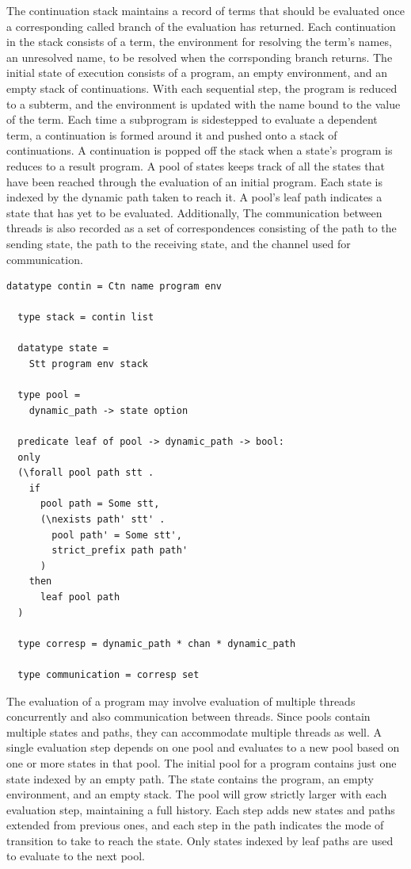 \documentclass[10pt]{article}
\begin{document}
The continuation stack maintains a record of terms that should be evaluated
once a corresponding called branch of the evaluation has returned.
Each continuation in the stack consists of a term, the environment for resolving the
term's names, an unresolved name, to be resolved when the corrsponding branch returns. 
The initial state of execution consists of a program, an empty environment, and an empty stack
of continuations. With each sequential step, the program is reduced to a subterm,
and the environment is updated with the name bound to the value of the term. Each time a
subprogram is sidestepped to evaluate a dependent term, a continuation is formed around
it and pushed onto a stack of continuations. A continuation is popped off the stack when a
state's program is reduces to a result program.  A pool of states keeps track of all the states
that have been reached through the evaluation of an initial program.  Each state is indexed by
the dynamic path taken to reach it. A pool's leaf path indicates a state that has yet to be
evaluated. Additionally, The communication between threads is also recorded as a set of
correspondences consisting of the path to the sending state, the path to the receiving state,
and the channel used for communication.

\begin{lstlisting}[language=logic, mathescape]
  datatype contin = Ctn name program env

  type stack = contin list

  datatype state =
    Stt program env stack 

  type pool =
    dynamic_path -> state option

  predicate leaf of pool -> dynamic_path -> bool:
  only
  (\forall pool path stt .
    if
      pool path = Some stt,
      (\nexists path' stt' .
        pool path' = Some stt',
        strict_prefix path path'
      )
    then
      leaf pool path
  )

  type corresp = dynamic_path * chan * dynamic_path

  type communication = corresp set 
\end{lstlisting}

The evaluation of a program may involve evaluation of multiple threads concurrently and also
communication between threads. Since pools contain multiple states and paths, they can
accommodate multiple threads as well.  A single evaluation step depends on one pool and
evaluates to a new pool based on one or more states in that pool. The initial pool for a
program contains just one state indexed by an empty path. The state contains the program, an
empty environment, and an empty stack. The pool will grow strictly larger with each evaluation
step, maintaining a full history. Each step adds new states and paths extended from previous
ones, and each step in the path indicates the mode of transition to take to reach the state.
Only states indexed by leaf paths are used to evaluate to the next pool.
\end{document}
